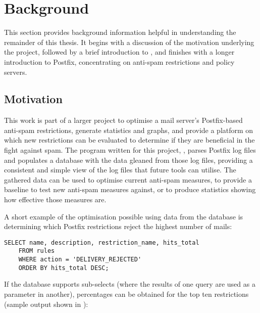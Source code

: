 \chapter{Background}

\label{background}

This section provides background information helpful in understanding the
remainder of this thesis.  It begins with a discussion of the motivation
underlying the project, followed by a brief introduction to ,
and finishes with a longer introduction to Postfix, concentrating on
anti-spam restrictions and policy servers.

\section{Motivation}

\label{motivation}

This work is part of a larger project to optimise a mail server's
Postfix-based anti-spam restrictions, generate statistics and graphs, and
provide a platform on which new restrictions can be evaluated to determine
if they are beneficial in the fight against spam.  The program written for
this project, \parsername{}, parses Postfix log files and populates a
database with the data gleaned from those log files, providing a consistent
and simple view of the log files that future tools can utilise.  The
gathered data can be used to optimise current anti-spam measures, to
provide a baseline to test new anti-spam measures against, or to produce
statistics showing how effective those measures are.

A short example of the optimisation possible using data from the database
is determining which Postfix restrictions reject the highest number of
mails:

\begin{verbatim}
SELECT name, description, restriction_name, hits_total
    FROM rules
    WHERE action = 'DELIVERY_REJECTED'
    ORDER BY hits_total DESC;
\end{verbatim}

If the database supports sub-selects (where the results of one query are
used as a parameter in another), percentages can be obtained for the top
ten restrictions (sample output shown in ):



